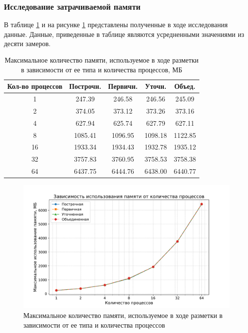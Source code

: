 \subsubsection{Исследование затрачиваемой памяти}

В таблице \ref{tab:pama} и на рисунке \ref{fig:pama} представлены полученные в ходе исследования данные.
Данные, приведенные в таблице являются усредненными значениями из десяти замеров.

\begin{table}[H]
    \centering
    \caption{Максимальное количество памяти, используемое в ходе разметки в зависимости от ее типа и количества процессов, МБ}
    \label{tab:pama}
    \begin{tabular}{|c|c|c|c|c|}
        \hline
        \textbf{Кол-во процессов} & \textbf{Построчн.} & \textbf{Первичн.} & \textbf{Уточн.} & \textbf{Объед.} \\ \hline
        1 & 247.39 & 246.58 & 246.56 & 245.09 \\ \hline
        2 & 374.05 & 373.12 & 373.26 & 373.16 \\ \hline
        4 & 627.94 & 625.74 & 627.79 & 627.11 \\ \hline
        8 & 1085.41 & 1096.95 & 1098.18 & 1122.85 \\ \hline
        16 & 1933.34 & 1934.43 & 1932.78 & 1935.12 \\ \hline
        32 & 3757.83 & 3760.95 & 3758.53 & 3758.38 \\ \hline
        64 & 6437.75 & 6444.76 & 6438.00 & 6440.77 \\ \hline
    \end{tabular}
\end{table}

\begin{figure}[H]
	\centering
	\includegraphics[width=\textwidth]{diag/pama.pdf}
    \caption{Максимальное количество памяти, используемое в ходе разметки в зависимости от ее типа и количества процессов}
	\label{fig:pama}
\end{figure}

